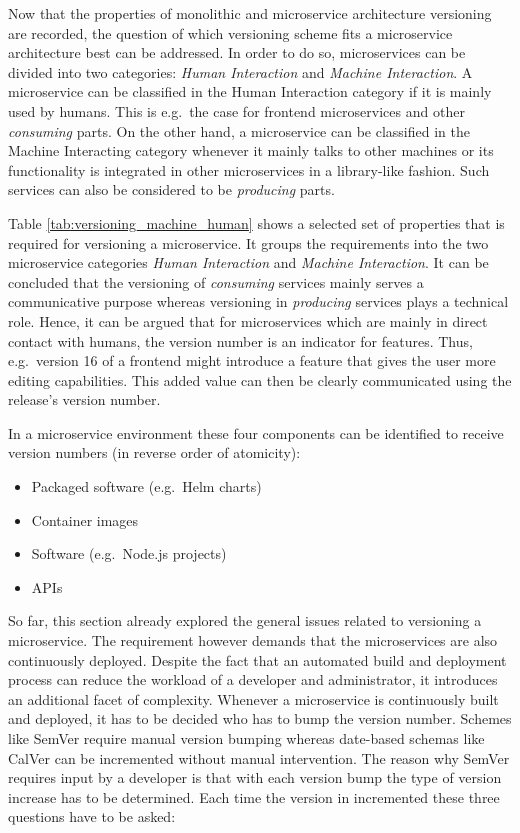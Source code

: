 Now that the properties of monolithic and microservice architecture versioning
are recorded, the question of which versioning scheme fits a microservice
architecture best can be addressed. In order to do so, microservices can be
divided into two categories: \textit{Human Interaction} and \textit{Machine
Interaction}. A microservice can be classified in the Human Interaction
category if it is mainly used by humans. This is e.g.\ the case for frontend
microservices and other \textit{consuming} parts. On the other hand, a
microservice can be classified in the Machine Interacting category whenever it
mainly talks to other machines or its functionality is integrated in other
microservices in a library-like fashion. Such services can also be considered
to be \textit{producing} parts.


Table \ref{tab:versioning_machine_human} shows a selected set of properties
that is required for versioning a microservice. It groups the requirements into
the two microservice categories \textit{Human Interaction} and \textit{Machine
Interaction}. It can be concluded that the versioning of \textit{consuming}
services mainly serves a communicative purpose whereas versioning in
\textit{producing} services plays a technical role. Hence, it can be argued
that for microservices which are mainly in direct contact with humans, the
version number is an indicator for features. Thus, e.g.\ version 16 of a
frontend might introduce a feature that gives the user more editing
capabilities. This added value can then be clearly communicated using the
release's version number.

In a microservice environment these four components can be identified to
receive version numbers (in reverse order of atomicity):

\begin{itemize}
  \item Packaged software (e.g.\ Helm charts)
  \item Container images
  \item Software (e.g.\ Node.js projects)
  \item \acp{API}
\end{itemize}

So far, this section already explored the general issues related to versioning
a microservice. The requirement however demands that the microservices are also
continuously deployed. Despite the fact that an automated build and deployment
process can reduce the workload of a developer and administrator, it introduces
an additional facet of complexity. Whenever a microservice is continuously
built and deployed, it has to be decided who has to bump the version number.
Schemes like SemVer require manual version bumping whereas date-based schemas
like CalVer can be incremented without manual intervention. The reason why
SemVer requires input by a developer is that with each version bump the type of
version increase has to be determined. Each time the version in incremented
these three questions have to be asked:

